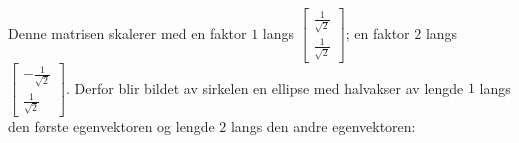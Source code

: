 \documentclass[titlepage,a4paper,12pt,norsk]{IMFeksamen}
\newcommand{\vv}[2]{\begin{bmatrix} #1 \\ #2 \end{bmatrix}}
\newcommand{\0}{\V{0}}
\begin{document}
\begin{oppgave}
Denne matrisen skalerer med en faktor $1$ langs $\vv{\frac{1}{\sqrt{2}}}{\frac{1}{\sqrt{2}}}$; en faktor $2$ langs $\vv{-\frac{1}{\sqrt{2}}}{\frac{1}{\sqrt{2}}}$. Derfor blir bildet av sirkelen en ellipse med halvakser av lengde $1$ langs den første egenvektoren og lengde $2$ langs den andre egenvektoren:

\begin{center}
\end{center}





\end{oppgave}
\end{document}
